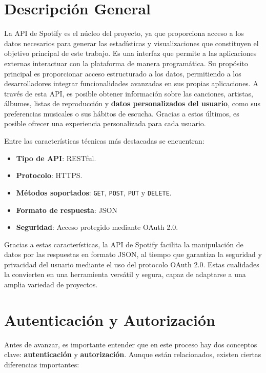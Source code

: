\section{Descripción General}

La API de Spotify es el núcleo del proyecto, ya que proporciona acceso a los datos necesarios para generar las estadísticas y visualizaciones que constituyen el objetivo principal de este trabajo. Es una interfaz que permite a las aplicaciones externas interactuar con la plataforma de manera programática. Su propósito principal es proporcionar acceso estructurado a los datos, permitiendo a los desarrolladores integrar funcionalidades avanzadas en sus propias aplicaciones. A través de esta API, es posible obtener información sobre las canciones, artistas, álbumes, listas de reproducción y \textbf{datos personalizados del usuario}, como sus preferencias musicales o sus hábitos de escucha. Gracias a estos últimos, es posible ofrecer una experiencia personalizada para cada usuario.

Entre las características técnicas más destacadas se encuentran:

\begin{itemize}
    \item \textbf{Tipo de API}: RESTful.
    \item \textbf{Protocolo}: HTTPS.
    \item \textbf{Métodos soportados}: \texttt{GET}, \texttt{POST}, \texttt{PUT} y \texttt{DELETE}.
    \item \textbf{Formato de respuesta}: JSON
    \item \textbf{Seguridad}: Acceso protegido mediante OAuth 2.0.
\end{itemize}

Gracias a estas características, la API de Spotify facilita la manipulación de datos por las respuestas en formato JSON, al tiempo que garantiza la seguridad y privacidad del usuario mediante el uso del protocolo OAuth 2.0. Estas cualidades la convierten en una herramienta versátil y segura, capaz de adaptarse a una amplia variedad de proyectos.

\newpage

\section{Autenticación y Autorización}

Antes de avanzar, es importante entender que en este proceso hay dos conceptos clave: \textbf{autenticación} y \textbf{autorización}. Aunque están relacionados, existen ciertas diferencias importantes:

